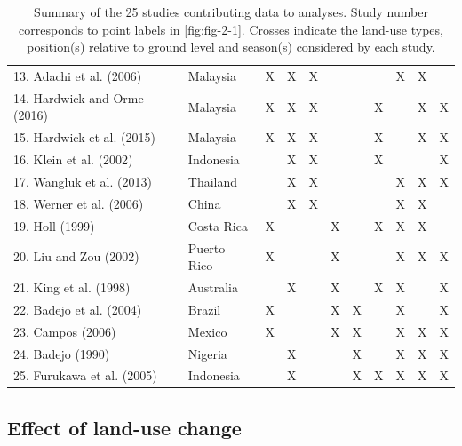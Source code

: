 \documentclass[12pt,a4paper,]{report}
\theoremstyle{definition}
\theoremstyle{definition}
\theoremstyle{definition}
\theoremstyle{remark}
\begin{document}
\begin{table}
\begin{tabular}{p{6.5cm}p{2.5cm}p{1.5cm}p{1.5cm}p{1.5cm}p{1.5cm}p{1.5cm}p{1.1cm}p{1.1cm}p{1.13cm}p{1.13cm}}
    13. Adachi et al. (2006)                  & Malaysia      & X & X & X &   &  &   & X &X &   \\
    14. Hardwick and Orme (2016)              & Malaysia      & X & X & X &   &  & X &   &X & X \\
    15. Hardwick et al. (2015)                & Malaysia      & X & X & X &   &  & X &   &X & X \\
    16. Klein et al. (2002)                   & Indonesia     &   & X & X &   &  & X &   &  & X \\
    17. Wangluk et al. (2013)                 & Thailand      &   & X & X &   &  &   & X &X & X \\
    18. Werner et al. (2006)                  & China         &   & X & X &   &  &   & X &X &   \\
    19. Holl (1999)                           & Costa Rica    & X &   &   & X &  & X & X &X &   \\
    20. Liu and Zou (2002)                    & Puerto Rico   & X &   &   & X &  &   & X &X & X \\
    21. King et al. (1998)                    & Australia     &   & X &   & X &  & X & X &  & X \\
    22. Badejo et al. (2004)                  & Brazil        & X &   &   & X &X &   & X &  & X \\
    23. Campos (2006)                         & Mexico        & X &   &   & X &X &   & X &X & X \\
    24. Badejo (1990)                         & Nigeria       &   & X &   &   &X &   & X &X & X \\
    25. Furukawa et al. (2005)                & Indonesia     &   & X &   &   &X & X & X &X & X \\
\bottomrule
\end{tabular}
\caption{\label{tab:tab-2-2}Summary of the 25 studies contributing data to analyses. Study number corresponds to point labels in \autoref{fig:fig-2-1}. Crosses indicate the land-use types, position(s) relative to ground level and season(s) considered by each study.}
\end{table}

\subsection{Effect of land-use change}\label{effect-of-land-use-change}
\end{document}
